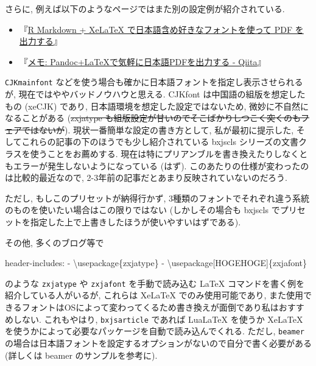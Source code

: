 \documentclass[
  letterpaper,
  DIV=11,
  pandoc,
  ja=standard,
  jafont=noto-otf]{bxjsarticle}
\newenvironment{Shaded}{\begin{snugshade}}{\end{snugshade}}
\newcommand{\AttributeTok}[1]{\textcolor[rgb]{0.00,0.48,0.65}{#1}}
\newcommand{\FunctionTok}[1]{\textcolor[rgb]{0.28,0.35,0.67}{#1}}
\newcommand{\KeywordTok}[1]{\textcolor[rgb]{0.00,0.48,0.65}{#1}}
\providecommand{\tightlist}{%
  \setlength{\itemsep}{0pt}\setlength{\parskip}{0pt}}
\begin{document}
さらに, 例えば以下のようなページではまた別の設定例が紹介されている.

\begin{itemize}
\tightlist
\item
  『\href{https://blog.atusy.net/2019/05/14/rmd2pdf-any-font/}{R
  Markdown + XeLaTeX で日本語含め好きなフォントを使って PDF
  を出力する}』
\item
  『\href{https://qiita.com/sky_y/items/15bf7737f4b37da50372\#\%E6\%96\%B9\%E6\%B3\%952-3-bxjscls\%E3\%81\%A7-cjkmainfont\%E5\%A4\%89\%E6\%95\%B0\%E3\%82\%92\%E4\%BD\%BF\%E3\%81\%86\%E6\%96\%B9\%E6\%B3\%95}{メモ:
  Pandoc+LaTeXで気軽に日本語PDFを出力する - Qiita}』
\end{itemize}

\texttt{CJKmainfont}
などを使う場合も確かに日本語フォントを指定し表示させられるが,
現在ではややバッドノウハウと思える. CJKfont は中国語の組版を想定したもの
(xeCJK) であり, 日本語環境を想定した設定ではないため,
微妙に不自然になることがある (\sout{zxjatype
も組版設定が甘いのでそこばかりしつこく突くのもフェアではないが}).
現状一番簡単な設定の書き方として, 私が最初に提示した,
そしてこれらの記事の下のほうでも少し紹介されている bxjscls
シリーズの文書クラスを使うことをお薦めする.
現在は特にプリアンブルを書き換えたりしなくともエラーが発生しないようになっている
(はず). このあたりの仕様が変わったのは比較的最近なので,
2-3年前の記事だとあまり反映されていないのだろう.

ただし, もしこのプリセットが納得行かず,
3種類のフォントでそれぞれ違う系統のものを使いたい場合はこの限りではない
(しかしその場合も bxjscls
でプリセットを指定した上で上書きしたほうが使いやすいはずである).

その他, 多くのブログ等で

\begin{Shaded}
\begin{Highlighting}[]
\FunctionTok{header{-}includes}\KeywordTok{:}\AttributeTok{ }
\AttributeTok{  }\KeywordTok{{-}}\AttributeTok{ \textbackslash{}usepackage\{zxjatype\} }
\AttributeTok{  }\KeywordTok{{-}}\AttributeTok{ \textbackslash{}usepackage[HOGEHOGE]\{zxjafont\}}
\end{Highlighting}
\end{Shaded}

のような \texttt{zxjatype} や \texttt{zxjafont} を手動で読み込む LaTeX
コマンドを書く例を紹介している人がいるが, これらは XeLaTeX
でのみ使用可能であり,
また使用できるフォントはOSによって変わってくるため書き換えが面倒であり私はおすすめしない.
これもやはり, \texttt{bxjsarticle} であれば LuaLaTeX を使うか XeLaTeX
を使うかによって必要なパッケージを自動で読み込んでくれる. ただし,
\texttt{beamer}
の場合は日本語フォントを設定するオプションがないので自分で書く必要がある
(詳しくは beamer のサンプルを参考に).
\end{document}
